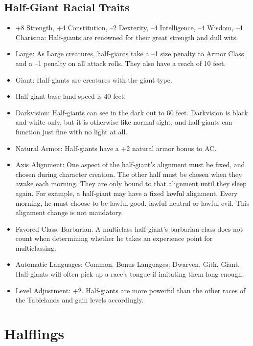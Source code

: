 \documentclass[10pt,a4paper,twocolumn]{d20}
\begin{document}
{\subsection{Half-Giant Racial Traits}
\begin{itemize}
    \item +8 Strength, +4 Constitution, –2 Dexterity, –4 Intelligence, –4 Wisdom, –4 Charisma: Half‐giants are renowned for their great strength and dull wits.
    \item Large: As Large creatures, half‐giants take a –1 size penalty to Armor Class and a –1 penalty on all attack rolls. They also have a reach of 10 feet.
    \item Giant: Half‐giants are creatures with the giant type.
    \item Half‐giant base land speed is 40 feet.
    \item Darkvision: Half‐giants can see in the dark out to 60 feet. Darkvision is black and white only, but it is otherwise like normal sight, and half‐giants can function just fine with no light at all.
    \item Natural Armor: Half‐giants have a +2 natural armor bonus to AC.
    \item Axis Alignment: One aspect of the half‐giant’s alignment must be fixed, and chosen during character creation. The other half must be chosen when they awake each morning. They are only bound to that alignment until they sleep again. For example, a half‐giant may have a fixed lawful alignment. Every morning, he must choose to be lawful good, lawful neutral or lawful evil. This alignment change is not mandatory.
    \item Favored Class: Barbarian. A multiclass half‐giant’s barbarian class does not count when determining whether he takes an experience point for multiclassing.
    \item Automatic Languages: Common. Bonus Languages: Dwarven, Gith, Giant. Half‐giants will often pick up a race’s tongue if imitating them long enough.
    \item Level Adjustment: +2. Half‐giants are more powerful than the other races of the Tablelands and gain levels accordingly.
\end{itemize}

\section{Halflings}

}
\end{document}
